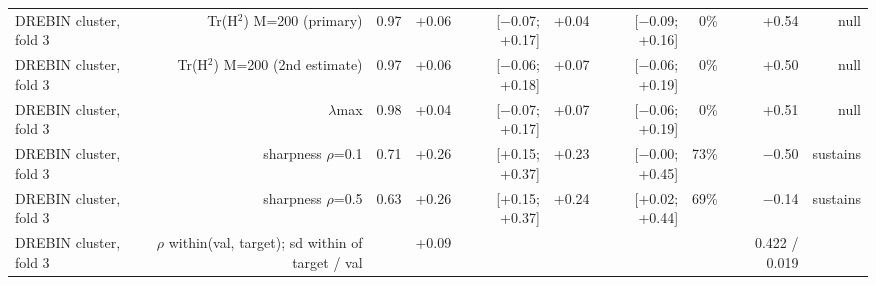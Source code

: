 \begin{table}[t]
\begin{tabular}{lrrrrrrrrr}
DREBIN cluster, fold 3 & Tr(H$^2$) M=200 (primary) & 0.97 & +0.06 & [$-$0.07; +0.17] & +0.04 & [$-$0.09; +0.16] & 0\% & +0.54 & null \\
DREBIN cluster, fold 3 & Tr(H$^2$) M=200 (2nd estimate) & 0.97 & +0.06 & [$-$0.06; +0.18] & +0.07 & [$-$0.06; +0.19] & 0\% & +0.50 & null \\
DREBIN cluster, fold 3 & $\lambda$max & 0.98 & +0.04 & [$-$0.07; +0.17] & +0.07 & [$-$0.06; +0.19] & 0\% & +0.51 & null \\
DREBIN cluster, fold 3 & sharpness $\rho$=0.1 & 0.71 & +0.26 & [+0.15; +0.37] & +0.23 & [$-$0.00; +0.45] & 73\% & $-$0.50 & sustains \\
DREBIN cluster, fold 3 & sharpness $\rho$=0.5 & 0.63 & +0.26 & [+0.15; +0.37] & +0.24 & [+0.02; +0.44] & 69\% & $-$0.14 & sustains \\
DREBIN cluster, fold 3 & $\rho$ within(val, target); sd within of target / val &  & +0.09 &  &  &  &  & 0.422 / 0.019 &  \\
\bottomrule
\end{tabular}
\end{table}
